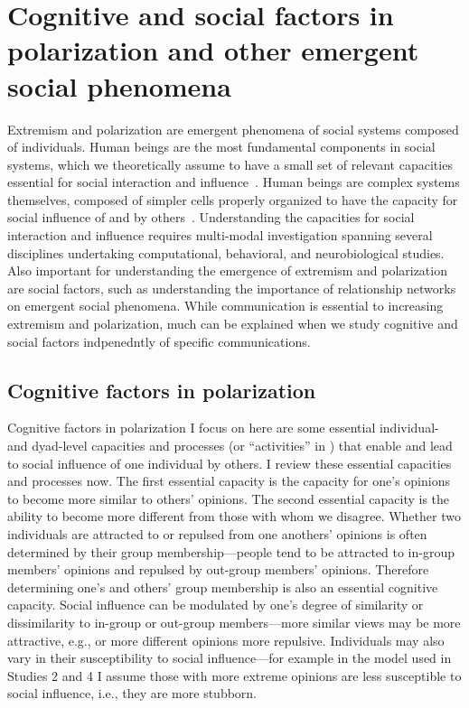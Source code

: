 \documentclass[12pt,letterpaper]{article}
\begin{document}
\section{Cognitive and social factors in polarization and other emergent social phenomena}

Extremism and polarization are emergent phenomena of social systems composed
of individuals. Human beings are the most fundamental components in social
systems, which we theoretically assume to have a small set of relevant
capacities essential for social interaction and 
influence~\cite{Cartwright1989,Smaldino2017}. 
Human beings are complex systems themselves,
composed of simpler cells properly organized to have the capacity for
social influence of and by others~\cite{Kello2007,Spivey2020}. Understanding
the capacities for social interaction and influence requires multi-modal
investigation spanning several disciplines undertaking computational,
behavioral, and neurobiological studies. Also important for understanding
the emergence of extremism and polarization are social factors, such as
understanding the importance of relationship networks on emergent
social phenomena. While communication is essential to increasing extremism and
polarization, much can be explained when we study cognitive and social factors
indpenedntly of specific communications.



\subsection{Cognitive factors in polarization}

Cognitive factors in polarization I focus on here are some essential
individual- and dyad-level capacities and processes (or ``activities'' in
) that
enable and lead to social influence of one individual by others. I review
these essential capacities and processes now. The first essential capacity
is the capacity for one's opinions to become more similar to others' opinions.
The second essential capacity is the ability to become more different from those
with whom we disagree. Whether two individuals are attracted to or repulsed
from one anothers' opinions is often determined by their group membership---people
tend to be attracted to in-group members' opinions and repulsed by out-group
members' opinions. Therefore determining one's and others' group membership is also an essential
cognitive capacity. Social influence can be modulated by one's degree of
similarity or dissimilarity to in-group or out-group members---more similar
views may be more attractive, e.g., or more different opinions more repulsive.
Individuals may also vary in their susceptibility to social influence---for
example in the model used in Studies 2 and 4 I assume those with more
extreme opinions are less susceptible to social influence, i.e., 
they are more stubborn.
\end{document}
